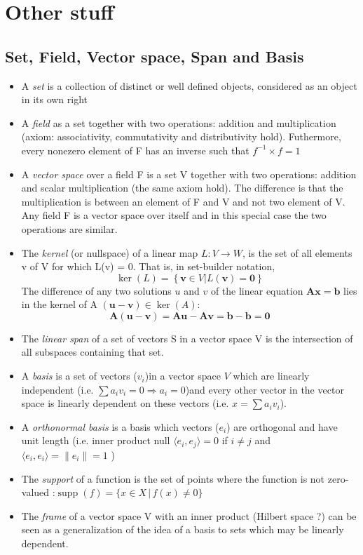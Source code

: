 \documentclass[twocolumn]{article}
\numberwithin{equation}{section}
\begin{document}
\section{Other stuff}

	\subsection{Set, Field, Vector space, Span and Basis}
\begin{itemize}
	\item A \textit{set} is a collection of distinct or well defined objects, considered as an object in its own right
	\item A \textit{field} as a set together with two operations: addition  and multiplication (axiom: associativity, commutativity and distributivity hold). Futhermore, every nonezero element of F has an inverse such that $f^{-1} \times f=1$
	\item A \textit{vector space} over a field F is a set V together with two operations: addition and scalar multiplication (the same axiom hold). The difference is that the multiplication is between an element of F and V and not two element of V. Any field F is a vector space over itself and in this special case the two operations are similar.
	\item The \textit{kernel} (or nullspace) of a linear map $L : V \rightarrow W$, is the set of all elements v of V for which L(v) = 0. That is, in set-builder notation,
$$\ker(L) = \left\{ \mathbf{v}\in V | L(\mathbf{v})=\mathbf{0} \right\}$$
The difference of any two solutions $u$ and $v$ of the linear equation $\mathbf{Ax = b}$ lies in the kernel of A $(\mathbf{u}-\mathbf{v}) \in \ker(A)$:
$$ \mathbf{A(u-v)} = \mathbf{Au} - \mathbf{Av} = \mathbf{b} - \mathbf{b} = \mathbf{0} $$
\item  The \textit{linear span} of a set of vectors S in a vector space V is the intersection of all subspaces containing that set.
	\item A \textit{basis} is a set of vectors ($v_i$)in a vector space $V$ which are linearly independent (i.e. $\sum a_i v_i=0 \Rightarrow a_i=0$)and every other vector in the vector space is linearly dependent on these vectors (i.e. $x=\sum a_i v_i$).
	\item A \textit{orthonormal basis} is a basis which vectors ($e_i$) are orthogonal and have unit length (i.e. inner product null $ \langle e_i, e_j\rangle=0$ if $i\neq j$ and  $\langle e_i, e_i\rangle = \|e_i\| = 1$ )
	\item The \textit{support} of a function  is the set of points where the function is not zero-valued :$\operatorname{supp}(f) = \{x\in X \,|\, f(x)\ne 0\}$
	\item The \textit{frame} of a vector space V with an inner product (Hilbert space ?) can be seen as a generalization of the idea of a basis to sets which may be linearly dependent.
\end{itemize}
\end{document}
